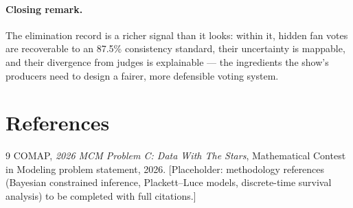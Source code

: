 \paragraph{Closing remark.} The elimination record is a richer signal than it
looks: within it, hidden fan votes are recoverable to an 87.5\% consistency
standard, their uncertainty is mappable, and their divergence from judges is
explainable --- the ingredients the show's producers need to design a fairer,
more defensible voting system.

\section*{References}
\begin{thebibliography}{9}
COMAP, \emph{2026 MCM Problem C: Data With The Stars}, Mathematical Contest in
Modeling problem statement, 2026.
{[Placeholder: methodology references (Bayesian constrained inference,
Plackett--Luce models, discrete-time survival analysis) to be completed with
full citations.]}
\end{thebibliography}

